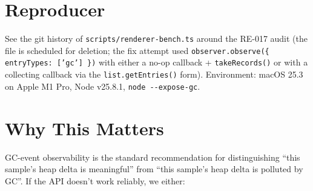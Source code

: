 \section{Reproducer}\label{record-310-reproducer}

See the git history of \texttt{s\allowbreak{}c\allowbreak{}r\allowbreak{}i\allowbreak{}p\allowbreak{}t\allowbreak{}s\allowbreak{}/\allowbreak{}r\allowbreak{}e\allowbreak{}n\allowbreak{}d\allowbreak{}e\allowbreak{}r\allowbreak{}e\allowbreak{}r\allowbreak{}-\allowbreak{}b\allowbreak{}e\allowbreak{}n\allowbreak{}c\allowbreak{}h\allowbreak{}.\allowbreak{}t\allowbreak{}s} around the RE-017 audit (the file is scheduled for deletion; the fix attempt used \texttt{o\allowbreak{}b\allowbreak{}s\allowbreak{}e\allowbreak{}r\allowbreak{}v\allowbreak{}e\allowbreak{}r\allowbreak{}.\allowbreak{}o\allowbreak{}b\allowbreak{}s\allowbreak{}e\allowbreak{}r\allowbreak{}v\allowbreak{}e\allowbreak{}(\allowbreak{}\{\allowbreak{} \allowbreak{}e\allowbreak{}n\allowbreak{}t\allowbreak{}r\allowbreak{}y\allowbreak{}T\allowbreak{}y\allowbreak{}p\allowbreak{}e\allowbreak{}s\allowbreak{}:\allowbreak{} \allowbreak{}[\allowbreak{}'\allowbreak{}g\allowbreak{}c\allowbreak{}'\allowbreak{}]\allowbreak{} \allowbreak{}\}\allowbreak{})} with either a no-op callback + \texttt{t\allowbreak{}a\allowbreak{}k\allowbreak{}e\allowbreak{}R\allowbreak{}e\allowbreak{}c\allowbreak{}o\allowbreak{}r\allowbreak{}d\allowbreak{}s\allowbreak{}(\allowbreak{})} or with a collecting callback via the \texttt{l\allowbreak{}i\allowbreak{}s\allowbreak{}t\allowbreak{}.\allowbreak{}g\allowbreak{}e\allowbreak{}t\allowbreak{}E\allowbreak{}n\allowbreak{}t\allowbreak{}r\allowbreak{}i\allowbreak{}e\allowbreak{}s\allowbreak{}(\allowbreak{})} form). Environment: macOS 25.3 on Apple M1 Pro, Node v25.8.1, \texttt{n\allowbreak{}o\allowbreak{}d\allowbreak{}e\allowbreak{} \allowbreak{}-\allowbreak{}-\allowbreak{}e\allowbreak{}x\allowbreak{}p\allowbreak{}o\allowbreak{}s\allowbreak{}e\allowbreak{}-\allowbreak{}g\allowbreak{}c}.

\section{Why This Matters}\label{record-310-why-this-matters}

GC-event observability is the standard recommendation for distinguishing ``this sample's heap delta is meaningful'' from ``this sample's heap delta is polluted by GC''. If the API doesn't work reliably, we either:

